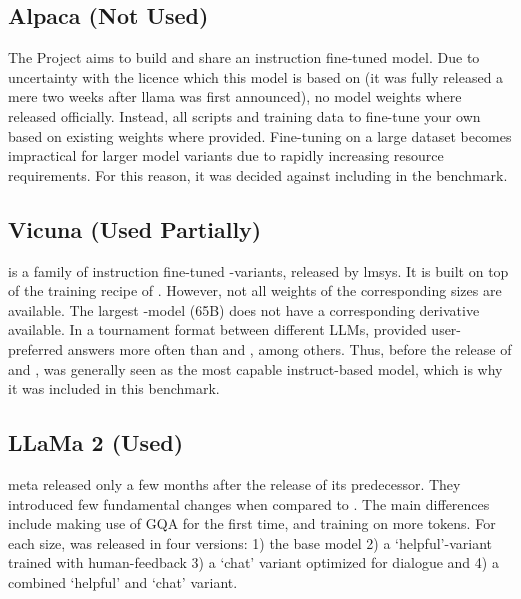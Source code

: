 \subsection{Alpaca (Not Used)}\label{sub:alpaca}
The  Project \cite{tatsulab_2023} aims to build and share an instruction fine-tuned  model.
Due to uncertainty with the  licence which this model is based on (it was fully released a mere two weeks after \gls{llama} was first announced), no model weights where released officially.
Instead, all scripts and training data to fine-tune your own  based on existing  weights where provided.
Fine-tuning on a large dataset becomes impractical for larger model variants due to rapidly increasing resource requirements.
For this reason, it was decided against including  in the benchmark.


\subsection{Vicuna (Used Partially)}\label{sub:vicuna}
 is a family of instruction fine-tuned -variants, released by \gls{lmsys}. It is built on top of the training recipe of .
However, not all weights of the corresponding  sizes are available.
The largest -model (65B) does not have a corresponding  derivative available.
In a tournament format between different \glspl{LLM},  provided user-preferred answers more often than  and  \cite{zheng_judging_2023}, among others.
Thus, before the release of  and ,  was generally seen as the most capable instruct-based model, which is why it was included in this benchmark.


\subsection{LLaMa 2 (Used)}\label{sub:llama2}
\gls{meta} released  \cite{touvron_llama2_2023} only a few months after the release of its predecessor.
They introduced few fundamental changes when compared to .
The main differences include making use of \gls{GQA} for the first time, and training on more tokens.
For each size,  was released in four versions: 1) the base model 2) a `helpful'-variant trained with human-feedback 3) a `chat' variant optimized for dialogue and 4) a combined `helpful' and `chat' variant.


